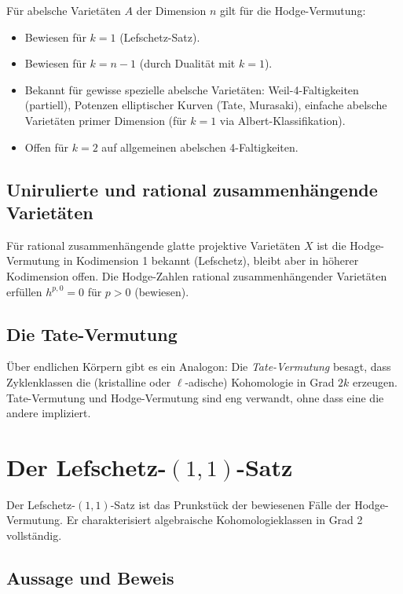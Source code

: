 \documentclass[12pt,a4paper]{amsart}
\theoremstyle{definition}
\theoremstyle{remark}
\begin{document}
Für abelsche Varietäten $A$ der Dimension $n$ gilt für die Hodge-Vermutung:
\begin{itemize}
\item Bewiesen für $k = 1$ (Lefschetz-Satz).
\item Bewiesen für $k = n-1$ (durch Dualität mit $k = 1$).
\item Bekannt für gewisse spezielle abelsche Varietäten: Weil-4-Faltigkeiten
  (partiell), Potenzen elliptischer Kurven (Tate, Murasaki), einfache abelsche
  Varietäten primer Dimension (für $k=1$ via Albert-Klassifikation).
\item Offen für $k = 2$ auf allgemeinen abelschen 4-Faltigkeiten.
\end{itemize}

\subsection{Unirulierte und rational zusammenhängende Varietäten}

Für rational zusammenhängende glatte projektive Varietäten $X$ ist die
Hodge-Vermutung in Kodimension 1 bekannt (Lefschetz), bleibt aber in höherer
Kodimension offen. Die Hodge-Zahlen rational zusammenhängender Varietäten
erfüllen $h^{p,0} = 0$ für $p > 0$ (bewiesen).

\subsection{Die Tate-Vermutung}

Über endlichen Körpern gibt es ein Analogon: Die \emph{Tate-Vermutung} besagt,
dass Zyklenklassen die (kristalline oder $\ell$-adische) Kohomologie in Grad $2k$
erzeugen. Tate-Vermutung und Hodge-Vermutung sind eng verwandt, ohne dass eine
die andere impliziert.

\section{Der Lefschetz-\texorpdfstring{$(1,1)$}{(1,1)}-Satz}
\label{sec:lefschetz}

Der Lefschetz-$(1,1)$-Satz ist das Prunkstück der bewiesenen Fälle der Hodge-Vermutung.
Er charakterisiert algebraische Kohomologieklassen in Grad 2 vollständig.

\subsection{Aussage und Beweis}
\end{document}
